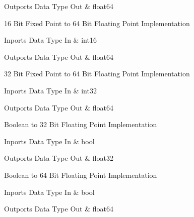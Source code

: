 \begin{XtoCtabular}{Outports Data Type}
Out & float64\tabularnewline
\hline
\end{XtoCtabular}

\ifdefined \AddTestReports
{}
\fi
{}
\nopagebreak[0]

16 Bit Fixed Point to 64 Bit Floating Point Implementation

\begin{XtoCtabular}{Inports Data Type}
In & int16\tabularnewline
\hline
\end{XtoCtabular}

\begin{XtoCtabular}{Outports Data Type}
Out & float64\tabularnewline
\hline
\end{XtoCtabular}

\ifdefined \AddTestReports
{}
\fi
{}
\nopagebreak[0]

32 Bit Fixed Point to 64 Bit Floating Point Implementation

\begin{XtoCtabular}{Inports Data Type}
In & int32\tabularnewline
\hline
\end{XtoCtabular}

\begin{XtoCtabular}{Outports Data Type}
Out & float64\tabularnewline
\hline
\end{XtoCtabular}

\ifdefined \AddTestReports
{}
\fi
{}
\nopagebreak[0]

Boolean to 32 Bit Floating Point Implementation

\begin{XtoCtabular}{Inports Data Type}
In & bool\tabularnewline
\hline
\end{XtoCtabular}

\begin{XtoCtabular}{Outports Data Type}
Out & float32\tabularnewline
\hline
\end{XtoCtabular}

\ifdefined \AddTestReports
{}
\fi
{}
\nopagebreak[0]

Boolean to 64 Bit Floating Point Implementation

\begin{XtoCtabular}{Inports Data Type}
In & bool\tabularnewline
\hline
\end{XtoCtabular}

\begin{XtoCtabular}{Outports Data Type}
Out & float64\tabularnewline
\hline
\end{XtoCtabular}

\ifdefined \AddTestReports
{}
\fi
